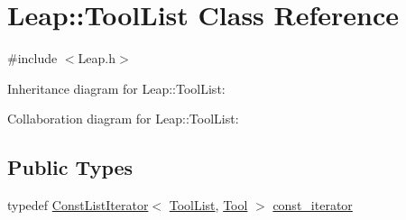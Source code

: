 \hypertarget{class_leap_1_1_tool_list}{}\section{Leap\+:\+:Tool\+List Class Reference}
\label{class_leap_1_1_tool_list}


{\ttfamily \#include $<$Leap.\+h$>$}



Inheritance diagram for Leap\+:\+:Tool\+List\+:


Collaboration diagram for Leap\+:\+:Tool\+List\+:
\subsection*{Public Types}
\begin{DoxyCompactItemize}
\item 
typedef \hyperlink{class_leap_1_1_const_list_iterator}{Const\+List\+Iterator}$<$ \hyperlink{class_leap_1_1_tool_list}{Tool\+List}, \hyperlink{class_leap_1_1_tool}{Tool} $>$ \hyperlink{class_leap_1_1_tool_list_a7f52ee5561016e8d42512e2adbc820de}{const\+\_\+iterator}
\end{DoxyCompactItemize}
